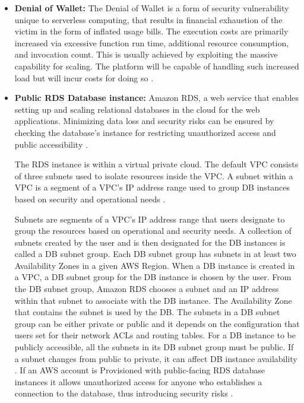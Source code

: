 \begin{itemize}
    \item \textbf{Denial of Wallet:} The Denial of Wallet is a form of security vulnerability unique to serverless
    computing,
    that results in financial exhaustion of the victim in the form of inflated usage bills.
    The execution costs are
    primarily increased via excessive function run time, additional resource consumption, and invocation count.
    This
    is usually achieved by exploiting the massive capability for scaling.
    The platform will be capable of handling
    such increased load but will incur costs for doing so \cite{54} \cite{55} \cite{56}.
\end{itemize}

\begin{itemize}
    \item \textbf{Public RDS Database instance:} Amazon RDS, a web service that enables setting up and scaling
    relational databases in the cloud for the web applications.
    Minimizing data loss and security risks can be
    ensured by checking the database’s instance for restricting unauthorized access and public accessibility \cite{57}.

    The RDS instance is within a virtual private cloud.
    The default VPC consists of three subnets used to 
    isolate resources inside the VPC. A subnet within a 
    VPC is a segment of a VPC's IP address range used to 
    group DB instances based on security and operational 
    needs \cite{58}.

    Subnets are segments of a VPC's IP address range that users designate to group the resources based on operational and security needs.
    A collection of subnets created by the user and is then designated for the DB instances is called a DB subnet group.
    Each DB subnet group has subnets in at least two Availability Zones in a given AWS Region.
    When a DB instance is created in a VPC, a DB subnet group for the DB instance is chosen by the user. From the DB subnet group, Amazon RDS chooses a subnet and an IP address within that subnet to associate with the DB instance. The Availability Zone that contains the subnet is used by the DB. The subnets in a DB subnet group can be either private or public and it depends on the configuration that users set for their network ACLs and routing tables. For a DB instance to be publicly accessible, all the subnets in its DB subnet group must be public. If a subnet changes from public to private, it can affect DB instance availability \cite{58}. If an AWS account is Provisioned with public-facing RDS database instances it allows unauthorized access for anyone who establishes a connection to the database, thus introducing security risks \cite{59}.
\end{itemize}

